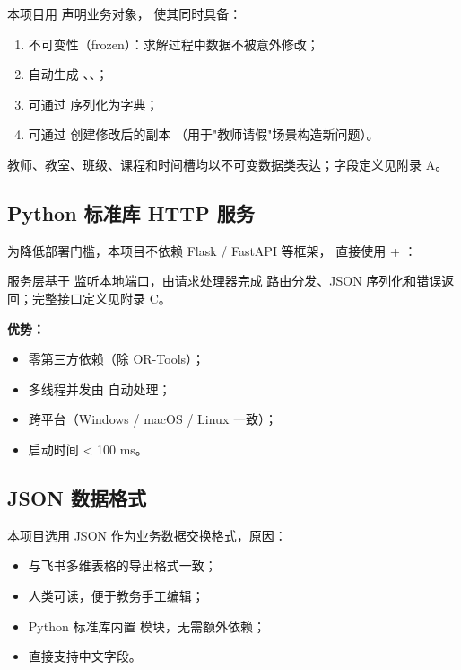 本项目用  声明业务对象，
使其同时具备：
\begin{enumerate}[leftmargin=2em,itemsep=0.2em]
\item 不可变性（frozen）：求解过程中数据不被意外修改；
\item 自动生成 、、；
\item 可通过  序列化为字典；
\item 可通过  创建修改后的副本
（用于"教师请假"场景构造新问题）。
\end{enumerate}

教师、教室、班级、课程和时间槽均以不可变数据类表达；字段定义见附录 A。

\subsection{Python 标准库 HTTP 服务}

为降低部署门槛，本项目不依赖 Flask / FastAPI 等框架，
直接使用  + ：

服务层基于  监听本地端口，由请求处理器完成
路由分发、JSON 序列化和错误返回；完整接口定义见附录 C。

\textbf{优势：}
\begin{itemize}[leftmargin=2em,itemsep=0.1em]
\item 零第三方依赖（除 OR-Tools）；
\item 多线程并发由  自动处理；
\item 跨平台（Windows / macOS / Linux 一致）；
\item 启动时间 < 100 ms。
\end{itemize}

\subsection{JSON 数据格式}

本项目选用 JSON 作为业务数据交换格式，原因：
\begin{itemize}[leftmargin=2em,itemsep=0.1em]
\item 与飞书多维表格的导出格式一致；
\item 人类可读，便于教务手工编辑；
\item Python 标准库内置  模块，无需额外依赖；
\item {} 直接支持中文字段。
\end{itemize}


